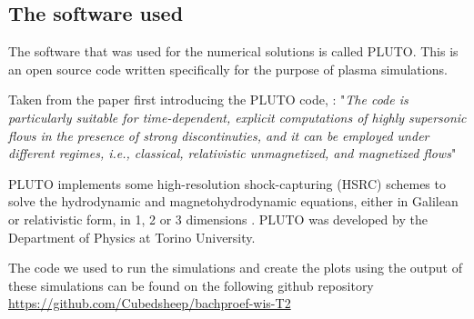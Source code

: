 \subsection*{The software used}

The software that was used for the numerical solutions is called PLUTO. 
This is an open source code written specifically for the purpose of plasma simulations. 

Taken from the paper first introducing the PLUTO code, \cite{pluto-paper}:
"\emph{The code is particularly suitable for time-dependent, explicit computations of highly supersonic flows in the presence of strong discontinuties, and it can be employed under different regimes, i.e., classical, relativistic unmagnetized, and magnetized flows}"

PLUTO implements some high-resolution shock-capturing (HSRC) schemes to solve the hydrodynamic and magnetohydrodynamic equations, either in Galilean or relativistic form, in 1, 2 or 3 dimensions \cite{pluto-paper}.
PLUTO was developed by the Department of Physics at Torino University.  \cite{pluto-manual}

The code we used to run the simulations and create the plots using the output of these simulations can be found on the following github repository \url{https://github.com/Cubedsheep/bachproef-wis-T2}
